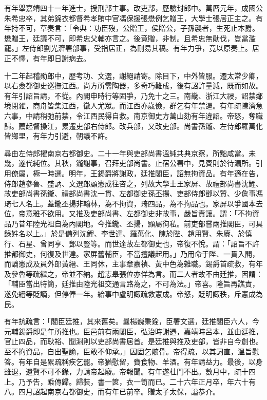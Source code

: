 \begin{pinyinscope}
有年舉嘉靖四十一年進士，授刑部主事。改吏部，歷驗封郎中。萬曆元年，成國公朱希忠卒，其弟錦衣都督希孝賄中官馮保援張懋例乞贈王，大學士張居正主之。有年持不可，草奏言：「令典：功臣歿，公贈王，侯贈公，子孫襲者，生死止本爵。懋贈王，廷議不可，即希忠父輔亦言之。後竟贈，非制。且希忠無勛伐，豈當濫寵。」左侍郎劉光濟署部事，受指居正，為刪易其稿。有年力爭，竟以原奏上。居正不懌，有年即日謝病去。

十二年起稽勛郎中，歷考功、文選，謝絕請寄。除目下，中外皆服。遷太常少卿，以右僉都御史巡撫江西。尚方所需陶器，多奇巧難成，後有詔許量減，既而如故。有年引詔旨請，不從。內閣申時行等固爭，乃免十之三。南畿、浙江大祲，詔禁鄰境閉糴，商舟皆集江西，徽人尤眾。而江西亦歲儉，群乞有年禁遏。有年疏陳濟急六事，中請稍弛前禁，令江西民得自救。南京御史方萬山劾有年違詔。帝怒，奪職歸。薦起督操江，累遷吏部右侍郎。改兵部，又改吏部。尚書孫鑨、左侍郎羅萬化皆鄉里，有年力引避，朝議不許。

尋由左侍郎擢南京右都御史。二十一年與吏部尚書溫純共典京察，所黜咸當。未幾，遂代純位。其秋，鑨謝事，召拜吏部尚書。止宿公署中，見賓則於待漏所。引用僚屬，極一時選。明年，王錫爵將謝政，廷推閣臣，詔無拘資品。有年適在告，侍郎趙參魯、盛訥、文選郎顧憲成往咨之，列故大學士王家屏、故禮部尚書沈鯉、故吏部尚書孫鑨、禮部尚書沈一貫、左都御史孫丕揚、吏部侍郎鄧以贊、少詹事馮琦七人名上。蓋鑨丕揚非翰林，為不拘資，琦四品，為不拘品也。家屏以爭國本去位，帝意雅不欲用。又推及吏部尚書、左都御史非故事，嚴旨責讓。謂：「不拘資品乃昔年陸光祖自為內閣地。今推鑨、丕揚，顯屬徇私。前吏部嘗兩推閣臣，可具錄姓名以上。」於是備列沈鯉、李世達、羅萬化、陳於陛、趙用賢、朱賡、於慎行、石星、曾同亨、鄧以豎等。而世達故左都御史也，帝復不悅。謂：「詔旨不許推都御史，何復及世達。家屏舊輔臣，不當擅議起用。」乃用命于陛、一貫入閣，而謫憲成及員外郎黃縉、王同休，主事章嘉禎、黃中色為雜職。錫爵首疏救，有年及參魯等疏繼之，帝並不納。趙志皋張位亦佯為言。而二人者故不由廷推，因謂：「輔臣當出特簡，廷推由陸光祖交通言路為之，不可為法。」帝喜。隆旨再譙責，遂免縉等貶謫，但停俸一年。給事中盧明諏疏救憲成。帝怒，貶明諏秩，斥憲成為民。

有年抗疏言：「閣臣廷推，其來舊矣。曩楊巍秉銓，臣署文選，廷推閣臣六人，今元輔錫爵即是年所推也。臣邑前有兩閣臣，弘治時謝遷，嘉靖時呂本，並由廷推，官止四品，而耿裕、聞淵則以吏部尚書居首。是廷推與推及吏部，皆非自今創也。至不拘資品，自出聖諭，臣敢不仰承。」因固乞骸骨。帝得疏，以其詞直，溫旨慰答。有年自是累疏稱疾乞罷。帝猶慰留，賚食物、羊酒。有年請益力。最後，以身雖退，遺賢不可不錄，力請帝起廢。帝報聞。有年遂杜門不出。數月中，疏十四上。乃予告，乘傳歸。歸裝，書一篋，衣一笥而已。二十六年正月卒，年六十有八。四月詔起南京右都御史，而有年已前卒。贈太子太保，謚恭介。


\end{pinyinscope}
